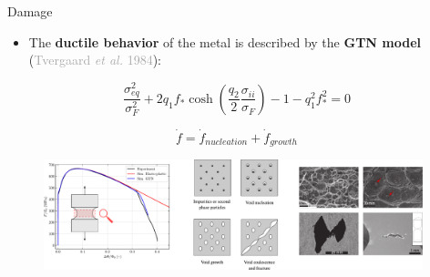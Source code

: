 \documentclass[9pt]{beamer}
\begin{document}

\begin{frame}{Damage}

    \begin{itemize}
        \item The \textbf{ductile behavior} of the metal is described by the \textbf{GTN model} (\textcolor{darkgray}{Tvergaard \textit{et al.} 1984}):
     \end{itemize}

        $$ \displaystyle \frac{\sigma_{eq}^2}{\sigma_F^2} + 2 q_1 f_* \cosh \left(\frac{q_2}{2} \frac{\sigma_{ii}}{\sigma_F}\right) - 1 -q_1^2 f_*^2 = 0 $$ 

        \vspace{0.15cm}

        $$ \displaystyle \dot{f} = \dot{f}_{nucleation} + \dot{f}_{growth} $$

        \vspace{0.15cm}

        \begin{figure}
            \centering
            \includegraphics[width=0.98\textwidth]{Images/GTN_sim_exp.pdf}
        \end{figure}
        
\end{frame}

\end{document}
